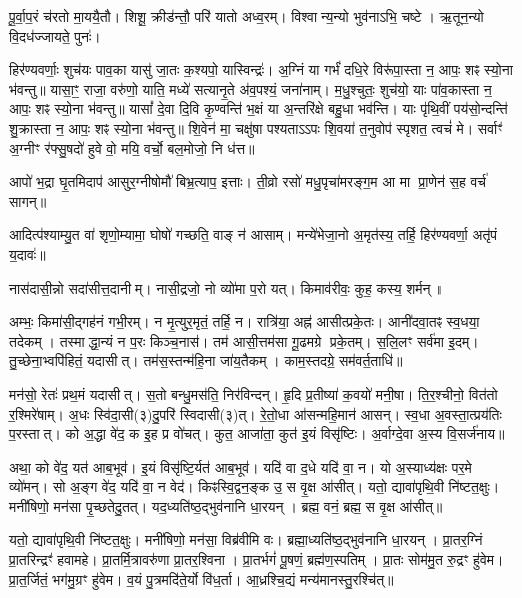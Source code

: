 पू॒र्वा॒प॒रं च॑रतो मा॒ययै॒तौ।
शिशू॒ क्रीड॑न्तौ॒ परि॑ यातो अध्व॒रम्।
विश्वान्य॒न्यो भुव॑नाऽभि॒ चष्टे।
ऋ॒तून॒न्यो वि॒दध॑ज्जायते॒ पुनः॑।

हिर॑ण्यवर्णाः॒ शुच॑यः पाव॒का यासु॑ जा॒तः क॒श्यपो॒ यास्विन्द्रः॑।
अ॒ग्निं या गर्भं॑ दधि॒रे विरू॑पा॒स्ता न॒ आपः॒ शꣴ स्यो॒ना भ॑वन्तु॥ 
यासा॒ꣳ॒ राजा॒ वरु॑णो॒ याति॒ मध्ये॑ सत्यानृ॒ते अ॑व॒पश्यं॒ जना॑नाम्।
म॒धु॒श्चुतः॒ शुच॑यो॒ याः पा॑व॒कास्ता न॒ आपः॒ शꣴ स्यो॒ना भ॑वन्तु॥ 
यासां᳚ दे॒वा दि॒वि कृ॒ण्वन्ति॑ भ॒क्षं या अ॒न्तरि॑क्षे बहु॒धा भव॑न्ति।
याः पृ॑थि॒वीं पय॑सो॒न्दन्ति॑ शु॒क्रास्ता न॒ आपः॒ शꣴ स्यो॒ना भ॑वन्तु॥ 
शि॒वेन॑ मा॒ चक्षु॑षा पश्यताऽऽपः शि॒वया॑ त॒नुवोप॑ स्पृशत॒ त्वचं॑ मे।
सर्वाꣳ॑ अ॒ग्नीꣳ र॑फ्सु॒षदो॑ हुवे वो॒ मयि॒ वर्चो॒ बल॒मोजो॒ नि ध॑त्त॥

आपो॑ भ॒द्रा घृ॒तमिदाप॑ आसुर॒ग्नीषोमौ॑ बिभ्र॒त्याप॒ इत्ताः।
ती॒व्रो रसो॑ मधु॒पृचा॑मरङ्ग॒म आ मा प्रा॒णेन॑ स॒ह वर्च॑ सागन्॥

आदित्प॑श्याम्यु॒त वा॑ शृणो॒म्यामा॒ घोषो॑ गच्छति॒ वाङ् न॑ आसाम्।
मन्ये॑भेजा॒नो अ॒मृत॑स्य॒ तर्\mbox{}हि॒ हिर॑ण्यवर्णा॒ अतृ॑पं य॒दावः॑॥


नास॑दासी॒न्नो सदा॑सीत्त॒दानीम्।
नासी॒द्रजो॒ नो व्यो॑मा प॒रो यत्।
किमाव॑रीवः॒ कुह॒ कस्य॒ शर्मन्॥

अम्भः॒ किमा॑सी॒द्गह॑नं गभी॒रम्।
न मृ॒त्युर॒मृतं॒ तर्\mbox{}हि॒ न।
रात्रि॑या॒ अह्न॑ आसीत्प्रके॒तः।
आनी॑दवा॒तꣴ स्व॒धया॒ तदेकम्।
तस्माद्धा॒न्यं न प॒रः किञ्च॒नास॑।
तम॑ आसी॒त्तम॑सा गू॒ढमग्रे प्रके॒तम्।
स॒लि॒लꣳ सर्व॑मा इ॒दम्।
तु॒च्छेना॒भ्वपि॑हितं॒ यदासीत्।
तम॑स॒स्तन्म॑हि॒ना जा॑य॒तैकम्।
काम॒स्तदग्रे॒ सम॑वर्त॒ताधि॑॥

मन॑सो॒ रेतः॑ प्रथ॒मं यदासीत्।
स॒तो बन्धु॒मस॑ति॒ निर॑विन्दन्।
हृ॒दि प्र॒तीष्या॑ क॒वयो॑ मनी॒षा।
ति॒र॒श्चीनो॒ वित॑तो र॒श्मिरे॑षाम्।
अ॒धः स्वि॑दा॒सी(३)दु॒परि॑ स्विदासी(३)त्।
रे॒तो॒धा आ॑सन्महि॒मान॑ आसन्।
स्व॒धा अ॒वस्ता॒त्प्रय॑तिः प॒रस्तात्।
को अ॒द्धा वे॑द॒ क इ॒ह प्र वो॑चत्।
कुत॒ आजा॑ता॒ कुत॑ इ॒यं विसृ॑ष्टिः।
अ॒र्वाग्दे॒वा अ॒स्य वि॒सर्ज॑नाय॥

अथा॒ को वे॑द॒ यत॑ आब॒भूव॑।
इ॒यं विसृ॑ष्टि॒र्यत॑ आब॒भूव॑।
यदि॑ वा द॒धे यदि॑ वा॒ न।
यो अ॒स्याध्य॑क्षः पर॒मे व्यो॑मन्।
सो अ॒ङ्ग वे॑द॒ यदि॑ वा॒ न वेद॑।
किꣴस्वि॒द्वन॒ङ्क उ॒ स वृ॒क्ष आ॑सीत्।
यतो॒ द्यावा॑पृथि॒वी नि॑ष्टत॒क्षुः।
मनी॑षिणो॒ मन॑सा पृ॒च्छतेदु॒तत्।
यद॒ध्यति॑ष्ठ॒द्भुव॑नानि धा॒रयन्।
ब्रह्म॒ वनं॒ ब्रह्म॒ स वृ॒क्ष आ॑सीत्॥


यतो॒ द्यावा॑पृथि॒वी नि॑ष्टत॒क्षुः।
मनी॑षिणो॒ मन॑सा॒ विब्र॑वीमि वः।
ब्रह्मा॒ध्यति॑ष्ठ॒द्भुव॑नानि धा॒रयन्।
प्रा॒तर॒ग्निं प्रा॒तरिन्द्रꣳ॑ हवामहे।
प्रा॒तर्मि॒त्रावरु॑णा प्रा॒तर॒श्विना।
प्रा॒तर्भगं॑ पू॒षणं॒ ब्रह्म॑ण॒स्पतिम्।
प्रा॒तः सोम॑मु॒त रु॒द्रꣳ हु॑वेम।
प्रा॒त॒र्जितं॒ भग॑मु॒ग्रꣳ हु॑वेम।
व॒यं पु॒त्रमदि॑ते॒र्यो वि॑ध॒र्ता।
आ॒ध्रश्चि॒द्यं मन्य॑मानस्तु॒रश्चि॑त्॥

